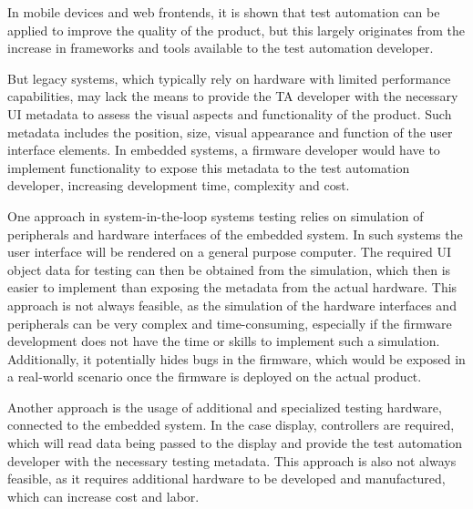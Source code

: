 \documentclass[Proposal,BIC,english,IEEE]{BASE/twbook} %
\begin{document}
In mobile devices and web frontends, it is shown that test automation can be applied to improve the quality of the product, but this largely originates from the increase in frameworks and tools available to the test automation developer.

But legacy systems, which typically rely on hardware with limited performance capabilities, may lack the means to provide the TA developer with the necessary UI metadata to assess the visual aspects and functionality of the product. Such metadata includes the position, size, visual appearance and function of the user interface elements. In embedded systems, a firmware developer would have to implement functionality to expose this metadata to the test automation developer, increasing development time, complexity and cost.

One approach in system-in-the-loop systems testing relies on simulation of peripherals and hardware interfaces of the embedded system. In such systems the user interface will be rendered on a general purpose computer. The required UI object data for testing can then be obtained from the simulation, which then is easier to implement than exposing the metadata from the actual hardware.
This approach is not always feasible, as the simulation of the hardware interfaces and peripherals can be very complex and time-consuming, especially if the firmware development does not have the time or skills to implement such a simulation. Additionally, it potentially hides bugs in the firmware, which would be exposed in a real-world scenario once the firmware is deployed on the actual product.

Another approach is the usage of additional and specialized testing hardware, connected to the embedded system. In the case display, controllers are required, which will read data being passed to the display and provide the test automation developer with the necessary testing metadata. This approach is also not always feasible, as it requires additional hardware to be developed and manufactured, which can increase cost and labor.
\end{document}
